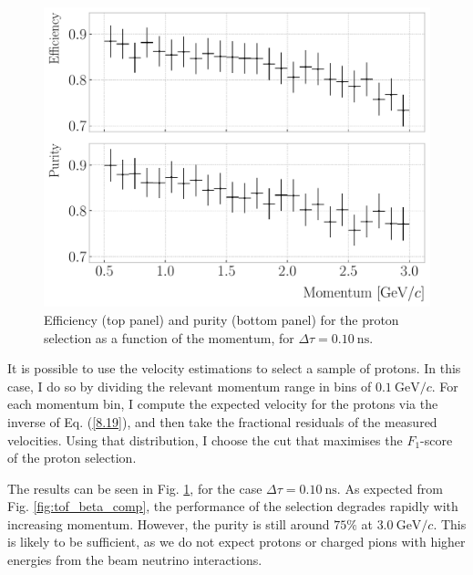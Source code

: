 \begin{figure}[t]
	\centering
	\includegraphics[width=.75\linewidth]{Images/GArSoft_PID/tof/proton_selection_beta_metrics.pdf}
	\caption[Efficiency and purity for the proton selection as a function of the momentum, for $\Delta \tau = 0.10 ~ \mathrm{ns}$.]{Efficiency (top panel) and purity (bottom panel) for the proton selection as a function of the momentum, for $\Delta \tau = 0.10 ~ \mathrm{ns}$.}
	\label{fig:tof_beta_selection}
\end{figure}

It is possible to use the velocity estimations to select a sample of protons. In this case, I do so by dividing the relevant momentum range in bins of $0.1~\mathrm{GeV}/c$. For each momentum bin, I compute the expected velocity for the protons via the inverse of Eq. (\ref{8.19}), and then take the fractional residuals of the measured velocities. Using that distribution, I choose the cut that maximises the $F_{1}$-score of the proton selection.

The results can be seen in Fig. \ref{fig:tof_beta_selection}, for the case $\Delta \tau = 0.10 ~ \mathrm{ns}$. As expected from Fig. \ref{fig:tof_beta_comp}, the performance of the selection degrades rapidly with increasing momentum. However, the purity is still around $75\%$ at $3.0~\mathrm{GeV}/c$. This is likely to be sufficient, as we do not expect protons or charged pions with higher energies from the beam neutrino interactions.

